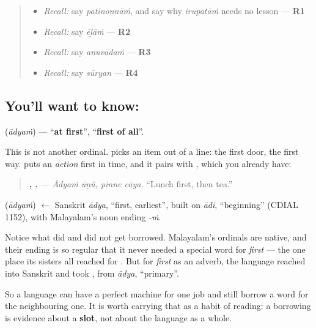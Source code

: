 \label{lesson:ML-C68-at-first}



\begin{quote}
\begin{itemize}
\raggedright
  \item \emph{Recall:} say \emph{patinonnāṁ}, and say why \emph{irupatāṁ} needs no lesson — \textbf{R1}
  \item \emph{Recall:} say \emph{ēḻāṁ} — \textbf{R2}
  \item \emph{Recall:} say \emph{anuvādaṁ} — \textbf{R3}
  \item \emph{Recall:} say \emph{sūryan} — \textbf{R4}
\end{itemize}
\end{quote}

\subsection*{You'll want to know: }
\textbf{} (\emph{ādyaṁ}) — \textquotedblleft{}\textbf{at first}\textquotedblright{}, \textquotedblleft{}\textbf{first of all}\textquotedblright{}.

This is not another ordinal. \textbf{} picks an item out of a line: the first door, the first way. \textbf{} puts an \emph{action} first in time, and it pairs with \textbf{}, which you already have:

\begin{quote}
\textbf{ ,  .} — \emph{Ādyaṁ ūṇŭ, pinne cāya.} \textquotedblleft{}Lunch first, then tea.\textquotedblright{}
\end{quote}

\begin{cousinweb}
\textbf{} (\emph{ādyaṁ}) $\leftarrow$ Sanskrit \emph{ādya}, \textquotedblleft{}first, earliest\textquotedblright{}, built on \emph{ādi}, \textquotedblleft{}beginning\textquotedblright{} (CDIAL 1152), with Malayalam's noun ending \emph{-ṁ}.
\end{cousinweb}

\begin{culture}
Notice what did and did not get borrowed. Malayalam's ordinals are native, and their ending is so regular that it never needed a special word for \emph{first} — the one place its sisters all reached for \textbf{}. But for \emph{first} as an adverb, the language reached into Sanskrit and took \textbf{}, from \emph{ādya}, \textquotedblleft{}primary\textquotedblright{}.

So a language can have a perfect machine for one job and still borrow a word for the neighbouring one. It is worth carrying that as a habit of reading: a borrowing is evidence about a \textbf{slot}, not about the language as a whole.
\end{culture}

